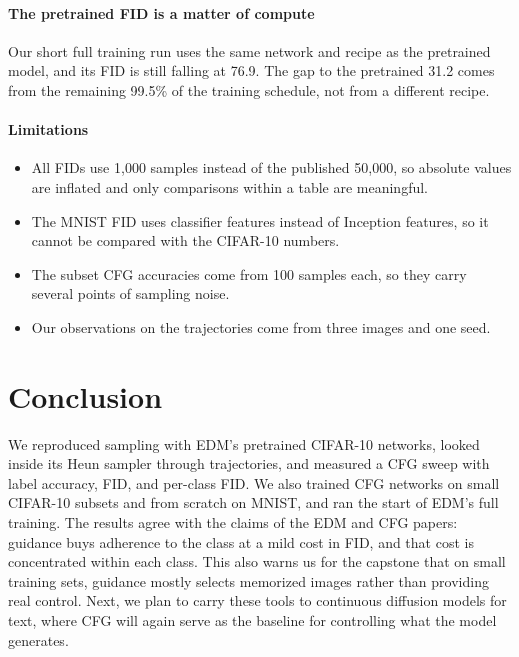 \documentclass[12pt,letterpaper]{article}
\begin{document}
\paragraph{The pretrained FID is a matter of compute}
Our short full training run uses the same network and recipe as the pretrained model, and its FID is still falling at 76.9.
The gap to the pretrained 31.2 comes from the remaining 99.5\% of the training schedule, not from a different recipe.

\paragraph{Limitations}
\begin{itemize}
    \item All FIDs use 1,000 samples instead of the published 50,000, so absolute values are inflated and only comparisons within a table are meaningful.
    \item The MNIST FID uses classifier features instead of Inception features, so it cannot be compared with the CIFAR-10 numbers.
    \item The subset CFG accuracies come from 100 samples each, so they carry several points of sampling noise.
    \item Our observations on the trajectories come from three images and one seed.
\end{itemize}

\section{Conclusion}

We reproduced sampling with EDM's pretrained CIFAR-10 networks, looked inside its Heun sampler through trajectories, and measured a CFG sweep with label accuracy, FID, and per-class FID.
We also trained CFG networks on small CIFAR-10 subsets and from scratch on MNIST, and ran the start of EDM's full training.
The results agree with the claims of the EDM and CFG papers: guidance buys adherence to the class at a mild cost in FID, and that cost is concentrated within each class.
This also warns us for the capstone that on small training sets, guidance mostly selects memorized images rather than providing real control.
Next, we plan to carry these tools to continuous diffusion models for text, where CFG will again serve as the baseline for controlling what the model generates.

\end{document}
